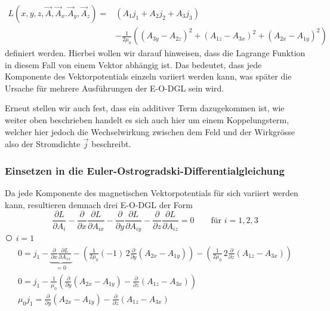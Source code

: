 	
	\begin{align}
	\label{maxwell:magnetostatikLagrange}
	L\left(x,y,z, \vec{A}, \vec{A}_x. \vec{A}_y, \vec{A}_z\right)
	=&\left( A_1j_1 + A_2j_2 + A_3j_3\right) \\ \nonumber
	 &- \frac{1}{2\mu_0}\left( 
	\left( A_{3y} - A_{2z}\right)^2 
	+ \left(A_{1z} -A_{3x}\right)^2
	+ \left(A_{2x} -A_{1y}\right)^2   
	\right)
	\end{align}
definiert werden. 
Hierbei wollen wir darauf hinweisen, dass die Lagrange Funktion in diesem Fall von einem Vektor abhängig ist. 
Das bedeutet, dass jede Komponente des Vektorpotentials einzeln variiert werden kann, was später die Ursache für mehrere Ausführungen der E-O-DGL sein wird.

Erneut stellen wir auch fest, dass ein additiver Term dazugekommen ist, wie weiter oben beschrieben handelt es sich auch hier um einem Koppelungsterm, welcher hier jedoch die Wechselwirkung zwischen dem Feld und der Wirkgrösse also der Stromdichte $\vec{j}$ beschreibt.

\subsubsection{Einsetzen in die Euler-Ostrogradski-Differentialgleichung}

Da jede Komponente des magnetischen Vektorpotentials für sich variiert werden kann, resultieren demnach drei E-O-DGL der Form
\[ 
\frac{\partial L}{\partial A_i} 
- \frac{\partial}{\partial x}\frac{\partial L}{\partial A_{ix}}
- \frac{\partial}{\partial y}\frac{\partial L}{\partial A_{iy}}
- \frac{\partial}{\partial z}\frac{\partial L}{\partial A_{iz}}
= 0 \qquad \text{für } i=1,2,3
 \]
{\larger\textcircled{}} $i = 1$
\begin{subequations}
\begin{gather}
	0
	=
	j_1 - \underbrace{\frac{\partial}{\partial x}\frac{\partial L}{\partial A_{1x}}}_{=0}
	 - \left( \frac{1}{2\mu_0}(-1)\,2 \frac{\partial}{\partial y}(A_{2x}-A_{1y})\right) 
	 - \left( \frac{1}{2\mu_0}\,2\frac{\partial}{\partial z}(A_{1z}-A_{3x})\right)
	 \\
	 0
	 =
	 j_1 - \frac{1}{\mu_0}\left( \frac{\partial}{\partial y}(A_{2x}-A_{1y})
	 - \frac{\partial}{\partial z}(A_{1z}-A_{3x})
	 \right)  
	 \\
	 
	 \mu_0j_1
	 =
	 \frac{\partial}{\partial y}(A_{2x}-A_{1y})
	 - \frac{\partial}{\partial z}(A_{1z}-A_{3x})	 	 	 
\end{gather}
\end{subequations}

